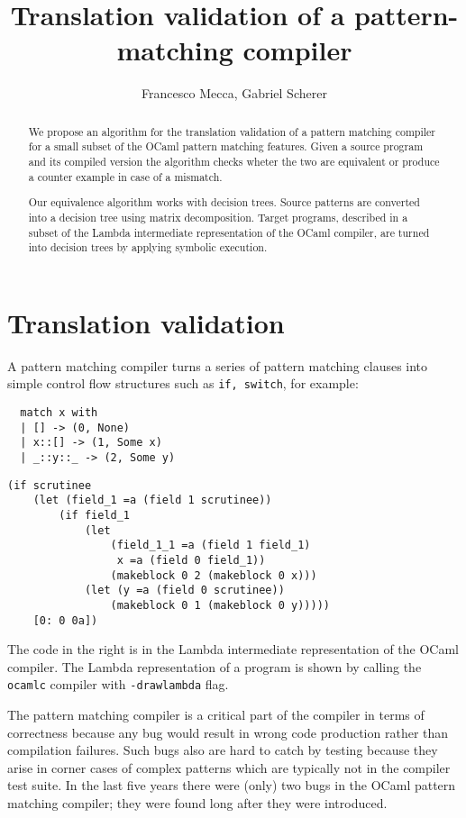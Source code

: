 \documentclass[12pt]{article}
\title{Translation validation of a pattern-matching compiler}
\author{Francesco Mecca, Gabriel Scherer}
\begin{document}
\maketitle

\begin{abstract}
We propose an algorithm for the translation validation of a pattern
matching compiler for a small subset of the OCaml pattern
matching features. Given a source program and its compiled version the
algorithm checks wheter the two are equivalent or produce a counter
example in case of a mismatch.

Our equivalence algorithm works with decision trees. Source patterns are
converted into a decision tree using matrix decomposition.
Target programs, described in a subset of the Lambda intermediate
representation of the OCaml compiler, are turned into decision trees
by applying symbolic execution.
\end{abstract}
\section{Translation validation}
A pattern matching compiler turns a series of pattern matching clauses
into simple control flow structures such as \texttt{if, switch}, for example:
\begin{lstlisting}
  match x with
  | [] -> (0, None)
  | x::[] -> (1, Some x)
  | _::y::_ -> (2, Some y)
\end{lstlisting}
\begin{lstlisting}
(if scrutinee
    (let (field_1 =a (field 1 scrutinee))
        (if field_1
            (let
                (field_1_1 =a (field 1 field_1)
                 x =a (field 0 field_1))
                (makeblock 0 2 (makeblock 0 x)))
            (let (y =a (field 0 scrutinee))
                (makeblock 0 1 (makeblock 0 y)))))
    [0: 0 0a])
\end{lstlisting}
The code in the right is in the Lambda intermediate representation of
the OCaml compiler. The Lambda representation of a program is shown by
calling the \texttt{ocamlc} compiler with \texttt{-drawlambda} flag.

The pattern matching compiler is a critical part of the compiler
in terms of correctness because any bug would result in wrong code
production rather than compilation failures.
Such bugs also are hard to catch by testing because they arise in
corner cases of complex patterns which are typically not in the
compiler test suite.
In the last five years there were (only) two bugs in the OCaml pattern
matching compiler; they were found long after they were introduced.
\end{document}
